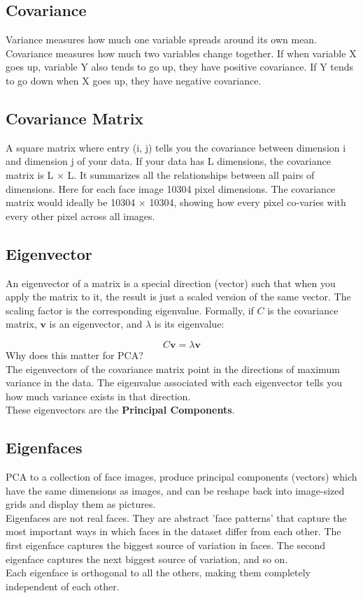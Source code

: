 \documentclass[12pt,a4paper]{article}
\begin{document}
\subsection{Covariance }
Variance measures how much one variable spreads around its own mean. Covariance measures how 
much two variables change together. If when variable X goes up, variable Y also tends to go up, they have 
positive covariance. If Y tends to go down when X goes up, they have negative covariance.

\subsection{Covariance Matrix}
A square matrix where entry (i, j) tells you the covariance between dimension i and dimension j of your data. 
If your data has L dimensions, the covariance matrix is L × L. It summarizes all the relationships between all pairs of dimensions.
Here for each face image 10304 pixel dimensions. The covariance matrix would ideally be 10304 × 10304, showing how every pixel 
co-varies with every other pixel across all images. 


\subsection{Eigenvector}
An eigenvector of a matrix is a special direction (vector) such that when you apply
the matrix to it, the result is just a scaled version of the same vector.
The scaling factor is the corresponding eigenvalue. Formally, if $C$ is the
covariance matrix, $\mathbf{v}$ is an eigenvector, and $\lambda$ is its eigenvalue:

\[
C \mathbf{v} = \lambda \mathbf{v}
\]
Why does this matter for PCA? \\
The eigenvectors of the covariance matrix point in the directions 
of maximum variance in the data. The eigenvalue associated with each eigenvector tells you how much variance exists in that direction.\\
These eigenvectors are the \textbf{Principal Components}.

\subsection{Eigenfaces}
PCA to a collection of face images, produce principal components (vectors) which have 
the same dimensions as images, and can be reshape back into image-sized grids and display them as pictures.\\
Eigenfaces are not real faces. They are abstract 'face patterns' that capture the most important ways in 
which faces in the dataset differ from each other. The first eigenface captures the biggest source of variation in faces. 
The second eigenface captures the next biggest source of variation, and so on.\\
Each eigenface is orthogonal to all the others, making them completely independent of each other.
\end{document}
